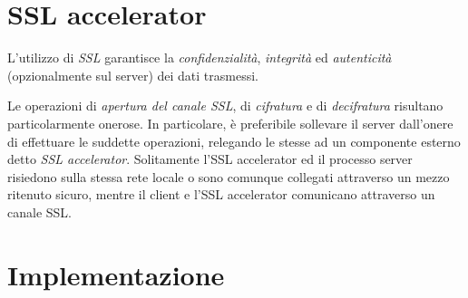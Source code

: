 \documentclass[10pt]{article}  %
\begin{document}
\section{SSL accelerator}
    L'utilizzo di \emph{SSL} garantisce la \emph{confidenzialità}, \emph{integrità}
    ed \emph{autenticità} (opzionalmente sul server) dei dati trasmessi.

    Le operazioni di \emph{apertura del canale SSL}, di \emph{cifratura} e di \emph{decifratura}
    risultano particolarmente onerose.
    In particolare, è preferibile sollevare il server dall'onere di effettuare le suddette operazioni,
    relegando le stesse ad un componente esterno detto \emph{SSL accelerator}.
    Solitamente l'SSL accelerator ed il processo server risiedono sulla stessa rete locale
    o sono comunque collegati attraverso un mezzo ritenuto sicuro, mentre il client e l'SSL accelerator
    comunicano attraverso un canale SSL.
\section{Implementazione}
\end{document}
